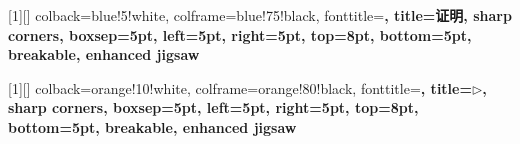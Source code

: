 [1][]{
    colback=blue!5!white,
    colframe=blue!75!black,
    fonttitle=\bfseries,
    title={\textbf{证明}},
    sharp corners,
    boxsep=5pt,
    left=5pt,
    right=5pt,
    top=8pt,
    bottom=5pt,
    breakable,
    enhanced jigsaw
}

[1][]{
    colback=orange!10!white,
    colframe=orange!80!black,
    fonttitle=\bfseries,
    title={{\Large$\triangleright$}},
    sharp corners,
    boxsep=5pt,
    left=5pt,
    right=5pt,
    top=8pt,
    bottom=5pt,
    breakable,
    enhanced jigsaw
}




\newcommand{\norm}[1]{\lVert #1 \rVert}  %
\newcommand{\ivec}[1]{\bm{#1}}           %
\newcommand{\pos}{\ivec{x}}              %
\newcommand{\vel}{\ivec{u}}              %
\newcommand{\kvec}{\ivec{k}}             %
\newcommand{\gravity}{\ivec{g}}          %
\newcommand{\timevar}{t}                 %
\newcommand{\streamfunc}{\psi}           %

\newcommand{\earthradius}{a}              %
\newcommand{\latitude}{\varphi}           %
\newcommand{\rotationvec}{\ivec{\Omega}}  %
\newcommand{\coriolis}{f}                 %
\newcommand{\rossby}{\beta}               %
\newcommand{\ro}{\varepsilon}             %

\newcommand{\pressure}{p}        %
\newcommand{\density}{\rho}      %
\newcommand{\temperature}{T}     %
\newcommand{\ptemp}{\theta}      %
\newcommand{\nonadheat}{Q}       %

\newcommand{\gravityconst}{g}   %
\newcommand{\gasconst}{R_d}     %
\newcommand{\specheat}{c_p}     %
\newcommand{\vspecheat}{c_v}    %
\newcommand{\viscosity}{\mu}    %
\newcommand{\pref}{p_\text{ref}}     %

\newcommand{\freeheight}{\eta}    %
\newcommand{\bottomheight}{h_b}   %
\newcommand{\depth}{H}            %
\newcommand{\gravpotential}{\phi} %

